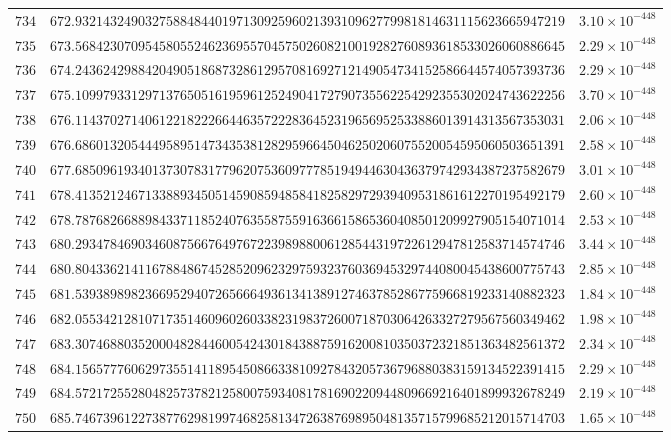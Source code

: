 \documentclass[12pt,reqno]{amsart}
\theoremstyle{remark}
\begin{document}
\begin{longtable}{clc}
$734$ & $672.9321432490327588484401971309259602139310962779981814631115623665947219$ & $3.10\times 10^{-448}$ \\
$735$ & $673.5684230709545805524623695570457502608210019282760893618533026060886645$ & $2.29\times 10^{-448}$ \\
$736$ & $674.2436242988420490518687328612957081692712149054734152586644574057393736$ & $2.29\times 10^{-448}$ \\
$737$ & $675.1099793312971376505161959612524904172790735562254292355302024743622256$ & $3.70\times 10^{-448}$ \\
$738$ & $676.1143702714061221822266446357222836452319656952533886013914313567353031$ & $2.06\times 10^{-448}$ \\
$739$ & $676.6860132054449589514734353812829596645046250206075520054595060503651391$ & $2.58\times 10^{-448}$ \\
$740$ & $677.6850961934013730783177962075360977785194944630436379742934387237582679$ & $3.01\times 10^{-448}$ \\
$741$ & $678.4135212467133889345051459085948584182582972939409531861612270195492179$ & $2.60\times 10^{-448}$ \\
$742$ & $678.7876826688984337118524076355875591636615865360408501209927905154071014$ & $2.53\times 10^{-448}$ \\
$743$ & $680.2934784690346087566764976722398988006128544319722612947812583714574746$ & $3.44\times 10^{-448}$ \\
$744$ & $680.8043362141167884867452852096232975932376036945329744080045438600775743$ & $2.85\times 10^{-448}$ \\
$745$ & $681.5393898982366952940726566649361341389127463785286775966819233140882323$ & $1.84\times 10^{-448}$ \\
$746$ & $682.0553421281071735146096026033823198372600718703064263327279567560349462$ & $1.98\times 10^{-448}$ \\
$747$ & $683.3074688035200048284460054243018438875916200810350372321851363482561372$ & $2.34\times 10^{-448}$ \\
$748$ & $684.1565777606297355141189545086633810927843205736796880383159134522391415$ & $2.29\times 10^{-448}$ \\
$749$ & $684.5721725528048257378212580075934081781690220944809669216401899932678249$ & $2.19\times 10^{-448}$ \\
$750$ & $685.7467396122738776298199746825813472638769895048135715799685212015714703$ & $1.65\times 10^{-448}$ \\

\end{longtable}
\end{document}

